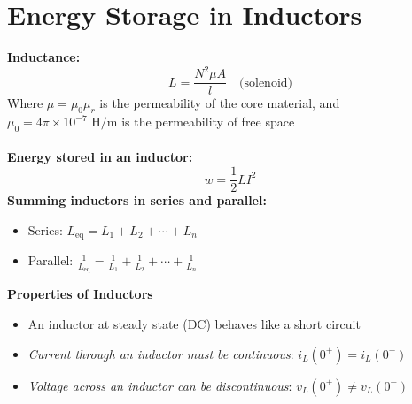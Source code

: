 \documentclass[12pt]{article}
\begin{document}
\section*{Energy Storage in Inductors}
\textbf{Inductance:}
\[L = \frac{N^2 \mu A}{l}\quad \text{(solenoid)}\]
Where $\mu = \mu_0 \mu_r$ is the permeability of the core material, and $\mu_0 = 4\pi \times 10^{-7} \text{ H/m}$ is the permeability of free space\\\\
\textbf{Energy stored in an inductor:}
\[w = \frac{1}{2}LI^2\]
\textbf{Summing inductors in series and parallel:}
\begin{itemize}
    \item Series: $L_\text{eq} = L_1 + L_2 + \cdots + L_n$
    \item Parallel: $\frac{1}{L_\text{eq}} = \frac{1}{L_1} + \frac{1}{L_2} + \cdots + \frac{1}{L_n}$
\end{itemize}
\textbf{Properties of Inductors}
\begin{itemize}
    \item An inductor at steady state (DC) behaves like a short circuit
    \item \textit{Current through an inductor must be continuous}: $i_L(0^+) = i_L(0^-)$
    \item \textit{Voltage across an inductor can be discontinuous}: $v_L(0^+) \neq v_L(0^-)$
\end{itemize}
\end{document}
